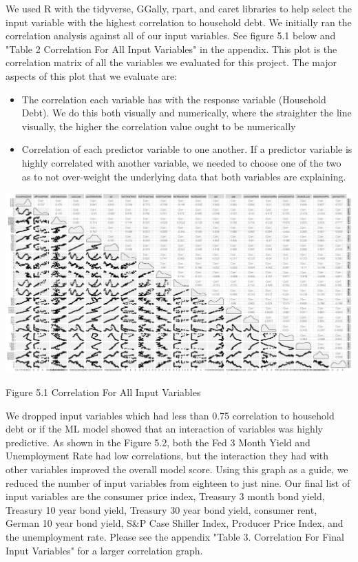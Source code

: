 \documentclass[sigconf,nonacm,11pt]{acmart}
\begin{document}
We used R with the tidyverse, GGally, rpart, and caret libraries to help select the input variable with the highest correlation to household debt. We initially ran the correlation analysis against all of our input variables. See figure 5.1 below and "Table 2 Correlation For All Input Variables" in the appendix. This plot is the correlation matrix of all the variables we evaluated for this project.  The major aspects of this plot that we evaluate are:


\begin{itemize}

\item The correlation each variable has with the response variable (Household Debt).  We do this both visually and numerically, where the straighter the line visually, the higher the correlation value ought to be numerically

\item Correlation of each predictor variable to one another.  If a predictor variable is highly correlated with another variable, we needed to choose one of the two as to not over-weight the underlying data that both variables are explaining.

\end{itemize}

\vspace{0.5em}
\includegraphics[scale = 0.12]{Correlation_Plot_All.png}

Figure 5.1 Correlation For All Input Variables
\vspace{0.75em}

We dropped input variables which had less than 0.75 correlation to household debt or if the ML model showed that an interaction of variables was highly predictive. As shown in the Figure 5.2, both the Fed 3 Month Yield and Unemployment Rate had low correlations, but the interaction they had with other variables improved the overall model score. Using this graph as a guide, we reduced the number of input variables from eighteen to just nine. Our final list of input variables are the consumer price index, Treasury 3 month bond yield, Treasury 10 year bond yield, Treasury 30 year bond yield, consumer rent, German 10 year bond yield, S&P Case Shiller Index, Producer Price Index, and the unemployment rate. Please see the appendix "Table 3. Correlation For Final Input Variables" for a larger correlation graph.
\end{document}
